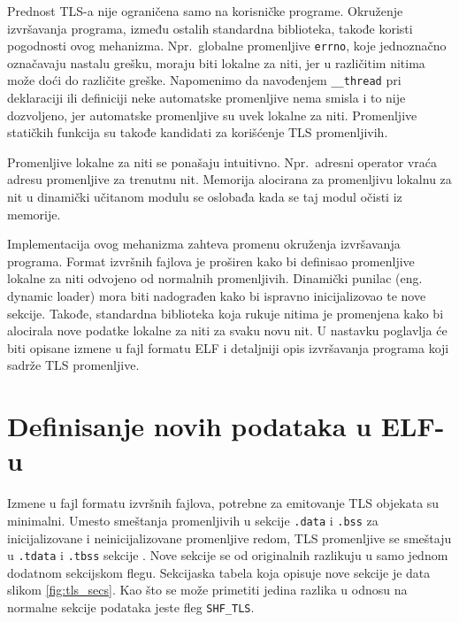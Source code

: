 \documentclass[12pt,oneside]{memoir}
\begin{document}
Prednost TLS-a nije ograničena samo na korisničke programe. Okruženje izvršavanja programa, između ostalih standardna biblioteka, takođe koristi pogodnosti ovog mehanizma. Npr.~globalne promenljive \texttt{errno}, koje jednoznačno označavaju nastalu grešku, moraju biti lokalne za niti, jer u različitim nitima može doći do različite greške. Napomenimo da navođenjem \texttt{\_\_thread} pri deklaraciji ili definiciji neke automatske promenljive nema smisla i to nije dozvoljeno, jer automatske promenljive su uvek lokalne za niti. Promenljive statičkih funkcija su takođe kandidati za korišćenje TLS promenljivih.

Promenljive lokalne za niti se ponašaju intuitivno. Npr.~adresni operator vraća adresu promenljive za trenutnu nit. Memorija alocirana za promenljivu lokalnu za nit u dinamički učitanom modulu se oslobađa kada se taj modul očisti iz memorije.

Implementacija ovog mehanizma zahteva promenu okruženja izvršavanja programa. Format izvršnih fajlova je proširen kako bi definisao promenljive lokalne za niti odvojeno od normalnih promenljivih. Dinamički punilac (eng. dynamic loader) mora biti nadograđen kako bi ispravno inicijalizovao te nove sekcije. Takođe, standardna biblioteka koja rukuje nitima je promenjena kako bi alocirala nove podatke lokalne za niti za svaku novu nit. U nastavku poglavlja će biti opisane izmene u fajl formatu ELF i detaljniji opis izvršavanja programa koji sadrže TLS promenljive.

\section{Definisanje novih podataka u ELF-u}

Izmene u fajl formatu izvršnih fajlova, potrebne za emitovanje TLS objekata su minimalni. Umesto smeštanja promenljivih u sekcije \texttt{.data} i \texttt{.bss} za inicijalizovane i neinicijalizovane promenljive redom, TLS promenljive se smeštaju u \texttt{.tdata} i \texttt{.tbss} sekcije \cite{TLS}. Nove sekcije se od originalnih razlikuju u samo jednom dodatnom sekcijskom flegu. Sekcijaska tabela koja opisuje nove sekcije je data slikom \ref{fig:tls_secs}. Kao što se može primetiti jedina razlika u odnosu na normalne sekcije podataka jeste fleg \texttt{SHF\_TLS}.
\end{document}
